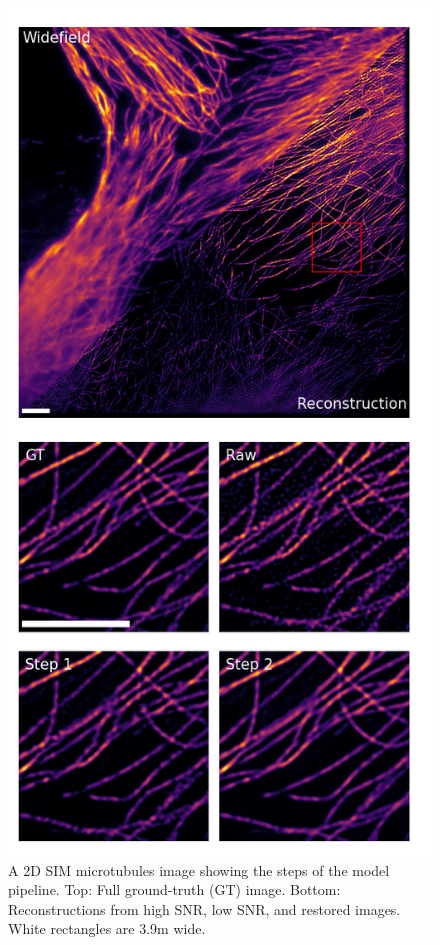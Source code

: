 \documentclass[12pt]{article}
\begin{document}
\begin{figure}[hbtp]
    \includegraphics[scale=0.8, center]{figures/microtub_samples.png}
    \caption{A 2D SIM microtubules image showing the steps of the model pipeline.
    Top: Full ground-truth (GT) image. Bottom: Reconstructions from high SNR, low SNR, and restored images. White rectangles are 3.9\textmu m wide.}
    \label{fig:microtub_samples}
\end{figure}
\end{document}
